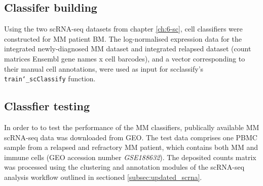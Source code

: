 \subsection{Classifer building}
Using the two scRNA-seq datasets from chapter \ref{ch:6-sc}, cell classifiers were constructed for MM patient BM\@.
The log-normalised expression data for the integrated newly-diagnosed MM dataset and integrated relapsed dataset (count matrices Ensembl gene names x cell barcodes), and a vector corresponding to their manual cell annotations, were used as input for scclassify's \texttt{train\char`_scClassify} function.


\subsection{Classfier testing}
In order to to test the performance of the MM classifiers, publically available MM scRNA-seq data was downloaded from GEO\@.
The test data comprises one PBMC sample from a relapsed and refractory MM patient, which contains both MM and immune cells (GEO accession number \textit{GSE188632}).
The deposited counts matrix was processed using the clustering and annotation modules of the scRNA-seq analysis workflow outlined in sectioned \ref{subsec:updated_scrna}.

